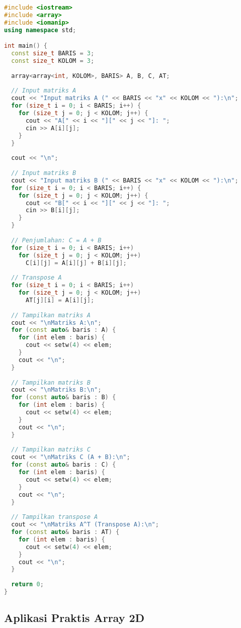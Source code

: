 \documentclass[../main.tex]{subfiles}
\begin{document}
\begin{lstlisting}[language=C++, caption={Program operasi matriks di C++}]
#include <iostream>
#include <array>
#include <iomanip>
using namespace std;

int main() {
  const size_t BARIS = 3;
  const size_t KOLOM = 3;
  
  array<array<int, KOLOM>, BARIS> A, B, C, AT;
  
  // Input matriks A
  cout << "Input matriks A (" << BARIS << "x" << KOLOM << "):\n";
  for (size_t i = 0; i < BARIS; i++) {
    for (size_t j = 0; j < KOLOM; j++) {
      cout << "A[" << i << "][" << j << "]: ";
      cin >> A[i][j];
    }
  }
  
  cout << "\n";
  
  // Input matriks B
  cout << "Input matriks B (" << BARIS << "x" << KOLOM << "):\n";
  for (size_t i = 0; i < BARIS; i++) {
    for (size_t j = 0; j < KOLOM; j++) {
      cout << "B[" << i << "][" << j << "]: ";
      cin >> B[i][j];
    }
  }
  
  // Penjumlahan: C = A + B
  for (size_t i = 0; i < BARIS; i++)
    for (size_t j = 0; j < KOLOM; j++)
      C[i][j] = A[i][j] + B[i][j];
  
  // Transpose A
  for (size_t i = 0; i < BARIS; i++)
    for (size_t j = 0; j < KOLOM; j++)
      AT[j][i] = A[i][j];
  
  // Tampilkan matriks A
  cout << "\nMatriks A:\n";
  for (const auto& baris : A) {
    for (int elem : baris) {
      cout << setw(4) << elem;
    }
    cout << "\n";
  }
  
  // Tampilkan matriks B
  cout << "\nMatriks B:\n";
  for (const auto& baris : B) {
    for (int elem : baris) {
      cout << setw(4) << elem;
    }
    cout << "\n";
  }
  
  // Tampilkan matriks C
  cout << "\nMatriks C (A + B):\n";
  for (const auto& baris : C) {
    for (int elem : baris) {
      cout << setw(4) << elem;
    }
    cout << "\n";
  }
  
  // Tampilkan transpose A
  cout << "\nMatriks A^T (Transpose A):\n";
  for (const auto& baris : AT) {
    for (int elem : baris) {
      cout << setw(4) << elem;
    }
    cout << "\n";
  }
  
  return 0;
}
\end{lstlisting}

\subsection{Aplikasi Praktis Array 2D}
\end{document}
